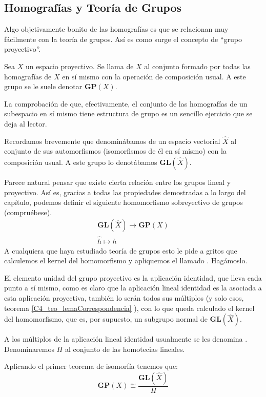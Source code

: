 \subsection{Homografías y Teoría de Grupos}
Algo objetivamente bonito de las homografías es que se relacionan muy fácilmente con la teoría de grupos. Así es como surge el concepto de ``grupo proyectivo''.
\begin{defi}
	Sea $X$ un espacio proyectivo. Se llama  de $X$ al conjunto formado por todas las homografías de $X$ en sí mismo con la operación de composición usual. A este grupo se le suele denotar $\mathbf{GP}(X)$.
\end{defi}
La comprobación de que, efectivamente, el conjunto de las homografías de un subespacio en sí mismo tiene estructura de grupo es un sencillo ejercicio que se deja al lector.

Recordamos brevemente que denominábamos  de un espacio vectorial $\widehat{X}$ al conjunto de sus automorfismos (isomorfismos de él en sí mismo) con la composición usual. A este grupo lo denotábamos $\mathbf{GL}(\widehat{X})$.

Parece natural pensar que existe cierta relación entre los grupos lineal y proyectivo. Así es, gracias a todas las propiedades demostradas a lo largo del capítulo, podemos definir el siguiente homomorfismo sobreyectivo de grupos (compruébese).
\[\begin{array}{c}
	\mathbf{GL}(\widehat{X})\to\mathbf{GP}(X)\\
	\widehat{h}\mapsto h
\end{array}\]
A cualquiera que haya estudiado teoría de grupos esto le pide a gritos que calculemos el kernel del homomorfismo y apliquemos el llamado . Hagámoslo.

El elemento unidad del grupo proyectivo es la aplicación identidad, que lleva cada punto a sí mismo, como es claro que la aplicación lineal identidad es la asociada a esta aplicación proyectiva, también lo serán todos sus múltiplos (y solo esos, teorema \ref{C4_teo_lemaCorrespondencia} ), con lo que queda calculado el kernel del homomorfismo, que es, por supuesto, un subgrupo normal de $\mathbf{GL}(\widehat{X})$.

A los múltiplos de la aplicación lineal identidad usualmente se les denomina . Denominaremos $H$ al conjunto de las homotecias lineales.

Aplicando el primer teorema de isomorfía tenemos que:
\[\mathbf{GP}(X)\cong\frac{\mathbf{GL}(\widehat{X})}{H}\]

